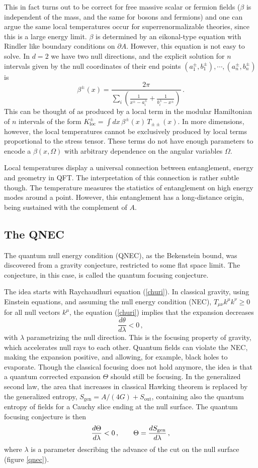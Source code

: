 \documentclass[12pt]{article}
\numberwithin{equation}{section}
\newcommand{\be}{\begin{equation}}
\newcommand{\ee}{\end{equation}}
\begin{document}
This in fact turns out to be correct for free massive scalar or fermion fields  ($\beta$ is independent of the mass, and the same for bosons and fermions) and one can argue the same local temperatures occur for superrenormalizable theories, since this is a large energy limit. $\beta$ is determined by an eikonal-type equation with Rindler like boundary conditions on $\partial A$. However, this equation is not easy to solve. In $d=2$ we have two null directions, and the explicit solution for $n$ intervals given by the null coordinates of their end points $(a_1^\pm,b_1^\pm),\cdots, (a_n^\pm,b_n^\pm)$ is
\be
\beta^\pm(x)=\frac{2\pi}{\sum_i \left(\frac{1}{x^\pm-a_i^\pm}+\frac{1}{b_i^\pm-x^\pm}\right)}\,.  
\ee
This can be thought of as produced by a local term in the modular Hamiltonian of $n$ intervals of the form $K^\pm_{\textrm{loc}}= \int dx\, \beta^\pm(x)\, T_{\pm\pm}(x)$. In more dimensions, however, the local temperatures cannot be exclusively produced by local terms proportional to the stress tensor. These terms do not have enough parameters to encode a $\beta(x,\Omega)$ with arbitrary dependence on the angular variables $\Omega$. 

Local temperatures display a universal connection between entanglement, energy and geometry in QFT. The interpretation of this connection is rather subtle though. The temperature measures the statistics of entanglement on high energy modes around a point. However, this entanglement has a long-distance origin, being sustained with the complement of $A$.     

\subsection{The QNEC}
The quantum null energy condition (QNEC), as the Bekenstein bound, was discovered from a gravity conjecture, restricted to some flat space limit. The conjecture, in this case, is called the quantum focusing conjecture. 

The idea starts with Raychaudhuri equation (\ref{churi}). In classical gravity, using Einstein equations, and assuming the null energy condition (NEC), $T_{\mu\nu}k^\mu k^\nu\ge 0$ for all null vectors $k^\mu$, the equation (\ref{churi}) implies that the expansion decreases
\be
\frac{d\theta}{d\lambda}<0\,,
\ee
with $\lambda$ parametrizing the null direction. 
 This is the focusing property of gravity, which accelerates null rays to each other. Quantum fields can violate the NEC, making the expansion positive, and allowing, for example, black holes to evaporate. Though the classical focusing does not hold anymore, the idea is that a quantum corrected expansion $\Theta$ should still be focusing. In the generalized second law, the area that increases in classical Hawking theorem is replaced by the generalized entropy, $S_{\textrm{gen}}=A/(4G)+S_{\textrm{out}}$, containing also the quantum entropy of fields for a Cauchy slice ending at the null surface. The quantum focusing conjecture is then
 \be
 \frac{d\Theta}{d\lambda}<0\,,\hspace{.7cm} \Theta= \frac{dS_{\textrm{gen}}}{d\lambda}\,,   
\ee
where $\lambda$ is a parameter describing the advance of the cut on the null surface (figure \ref{qnec}). 
\end{document}

